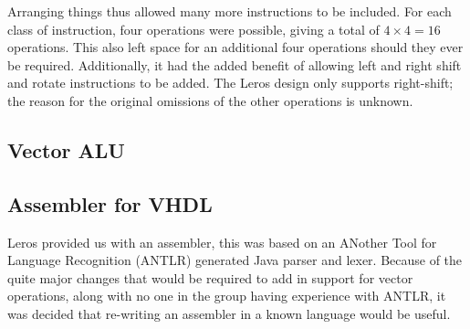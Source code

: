 Arranging things thus allowed many more instructions to be included. For each
class of instruction, four operations were possible, giving a total of $4 \times
4 = 16$ operations. This also left space for an additional four operations
should they ever be required. Additionally, it  had the added benefit of
allowing left and right shift and rotate instructions to be added. The Leros
design only supports right-shift; the reason for the original omissions of the other
operations is unknown.



\subsection{Vector ALU}
\subsection{Assembler for VHDL}

  Leros provided us with an assembler, this was based on an ANother Tool for
  Language Recognition (ANTLR) generated Java parser and lexer.  Because of the
  quite major changes that would be required to add in support for vector
  operations, along with no one in the group having experience with ANTLR, it
  was decided that re-writing an assembler in a known language would be useful.
